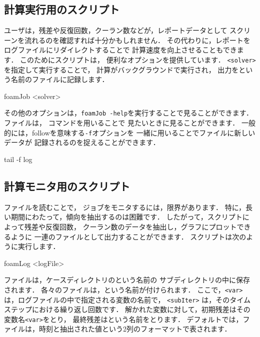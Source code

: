 \subsection{計算実行用のスクリプト}
\label{ssec:6.6.1}
%
%
ユーザは，残差や反復回数，クーラン数などが，レポートデータとして
スクリーンを流れるのを確認すれば十分かもしれません．
その代わりに，レポートをログファイルにリダイレクトすることで
計算速度を向上させることもできます．
このためにスクリプトは，
便利なオプションを提供しています．
\verb|<solver>|を指定して実行することで，
計算がバックグラウンドで実行され，
出力をという名前のファイルに記録します．
\begin{OFverbatim}[terminal]
foamJob <solver>
\end{OFverbatim}
その他のオプションは，\verb|foamJob -help|を実行することで見ることができます．
ファイルは， コマンドを用いることで
見たいときに見ることができます．
一般的には，followを意味する\verb|-f|オプションを
一緒に用いることでファイルに新しいデータが
記録されるのを捉えることができます．
\begin{OFverbatim}[terminal]
tail -f log
\end{OFverbatim}


\subsection{計算モニタ用のスクリプト}
\label{ssec:6.6.2}
%
%
ファイルを読むことで，
ジョブをモニタするには，限界があります．
特に，長い期間にわたって，傾向を抽出するのは困難です．
したがって，スクリプトによって残差や反復回数，
クーラン数のデータを抽出し，グラフにプロットできるように
一連のファイルとして出力することができます．
スクリプトは次のように実行します．
\begin{OFverbatim}[terminal]
foamLog <logFile>
\end{OFverbatim}
ファイルは，ケースディレクトリのという名前の
サブディレクトリの中に保存されます．
各々のファイルは，という名前が付けられます．
ここで，\texttt{<var>} は，ログファイルの中で指定される変数の名前で，
\texttt{<subIter>} は，そのタイムステップにおける繰り返し回数です．
解かれた変数に対して，初期残差はその変数名\texttt{<var>}をとり，
最終残差はという名前をとります．
デフォルトでは，ファイルは，時刻と抽出された値という2列のフォーマットで表されます．

